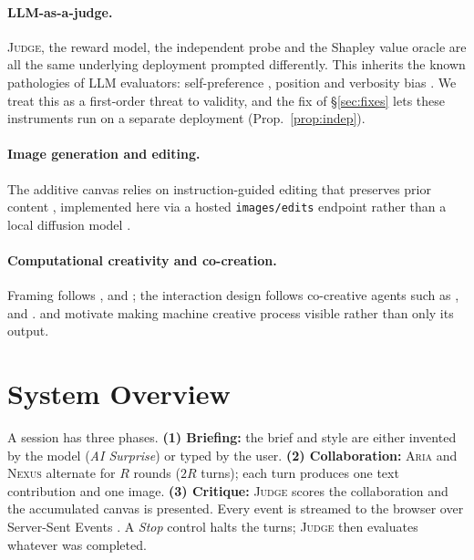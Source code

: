 \documentclass[11pt]{article}
\newcommand{\code}[1]{\texttt{\small #1}}
\newcommand{\ARIA}{\textsc{Aria}}
\newcommand{\NEXUS}{\textsc{Nexus}}
\newcommand{\JUDGE}{\textsc{Judge}}
\theoremstyle{plain}
\theoremstyle{definition}
\begin{document}
\paragraph{LLM-as-a-judge.}
\JUDGE{}, the reward model, the independent probe and the Shapley value oracle
are all the same underlying deployment prompted differently. This inherits the
known pathologies of LLM evaluators: self-preference
\citep{panickssery2024llm}, position and verbosity bias
\citep{wang2024large,zheng2023judging}. We treat this as a first-order threat to
validity, and the fix of \S\ref{sec:fixes} lets these instruments run on a
separate deployment (Prop.~\ref{prop:indep}).

\paragraph{Image generation and editing.}
The additive canvas relies on instruction-guided editing that preserves prior
content \citep{meng2022sdedit,hertz2023prompt,brooks2023instructpix2pix},
implemented here via a hosted \code{images/edits} endpoint
\citep{microsoft2025azure} rather than a local diffusion model
\citep{rombach2022high}.

\paragraph{Computational creativity and co-creation.}
Framing follows \citet{boden2004creative}, \citet{colton2012computational} and
\citet{ritchie2007some}; the interaction design follows co-creative agents such
as \citet{davis2016empirically}, \citet{oh2018lead} and
\citet{karimi2020creative}. \citet{epstein2023art} and
\citet{doshi2024generative} motivate making machine creative process visible
rather than only its output.

\section{System Overview}
\label{sec:overview}
A session has three phases. \textbf{(1) Briefing:} the brief and style are
either invented by the model (\emph{AI Surprise}) or typed by the user.
\textbf{(2) Collaboration:} \ARIA{} and \NEXUS{} alternate for $R$ rounds
($2R$ turns); each turn produces one text contribution and one image.
\textbf{(3) Critique:} \JUDGE{} scores the collaboration and the accumulated
canvas is presented. Every event is streamed to the browser over Server-Sent
Events \citep{whatwg2024sse}. A \emph{Stop} control halts the turns; \JUDGE{}
then evaluates whatever was completed.
\end{document}
